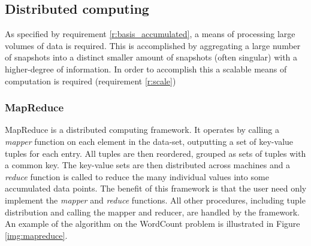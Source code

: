 
\subsection{Distributed computing}
As specified by requirement \ref{r:basis_accumulated}, a means of processing large volumes of data is required. This is accomplished by aggregating a large number of snapshots into a distinct smaller amount of snapshots (often singular) with a higher-degree of information. In order to accomplish this a scalable means of computation is required (requirement \ref{r:scale}) 
\subsubsection{MapReduce}
MapReduce \cite{mapreduce} is a distributed computing framework. It operates by calling a \emph{mapper} function on each element in the data-set, outputting a set of key-value tuples for each entry. All tuples are then reordered, grouped as sets of tuples with a common key. The key-value sets are then distributed across machines and a \emph{reduce} function is called to reduce the many individual values into some accumulated data points. The benefit of this framework is that the user need only implement the \emph{mapper} and \emph{reduce} functions. All other procedures, including tuple distribution and calling the mapper and reducer, are handled by the framework. An example of the algorithm on the WordCount problem is illustrated in Figure \ref{img:mapreduce}.

